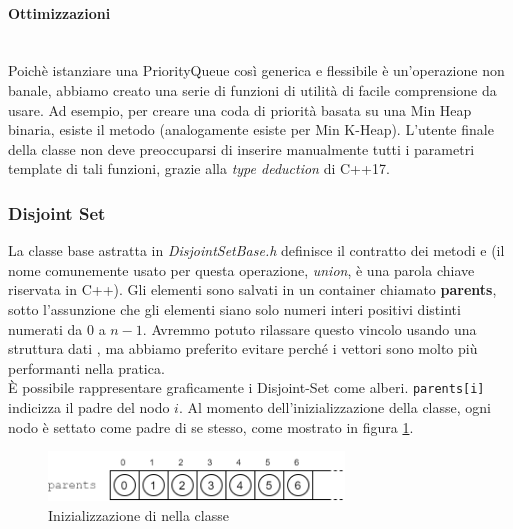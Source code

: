 \paragraph{Ottimizzazioni}\mbox{} \\

\noindent Poichè istanziare una PriorityQueue così generica e flessibile è un'operazione non banale, abbiamo creato una serie di funzioni di utilità di facile comprensione da usare. Ad esempio, per creare una coda di priorità basata su una Min Heap binaria, esiste il metodo  (analogamente esiste  per Min K-Heap).
L'utente finale della classe non deve preoccuparsi di inserire manualmente tutti i parametri template di tali funzioni, grazie alla \textit{type deduction} di C++17.

\subsubsection{Disjoint Set}

La classe base astratta in \textit{DisjointSetBase.h} definisce il contratto dei metodi  e  (il nome comunemente usato per questa operazione, \textit{union}, è una parola chiave riservata in C++).
Gli elementi sono salvati in un container  chiamato \textbf{parents}, sotto l'assunzione che gli elementi siano solo numeri interi positivi distinti numerati da $0$ a $n-1$.
Avremmo potuto rilassare questo vincolo usando una struttura dati , ma abbiamo preferito evitare perché i vettori sono molto più performanti nella pratica. \\

\noindent È possibile rappresentare graficamente i Disjoint-Set come alberi.
\texttt{parents[i]} indicizza il padre del nodo $i$. Al momento dell'inizializzazione della classe, ogni nodo è settato come padre di se stesso, come mostrato in figura \ref{fig:disjoint-set-base-parents}.

\begin{figure}[htbp]
	\centering
	\includegraphics[width=0.7\textwidth]{./images/DisjointSetParentsVector.png}
	\caption{Inizializzazione di  nella classe }
	\label{fig:disjoint-set-base-parents}
\end{figure}

